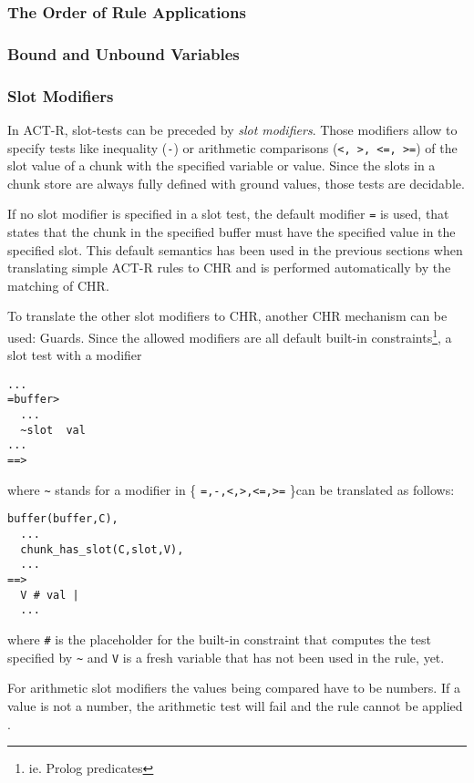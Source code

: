 \subsubsection{The Order of Rule Applications}

\subsubsection{Bound and Unbound Variables}

\subsubsection{Slot Modifiers}

In ACT-R, slot-tests can be preceded by \emph{slot modifiers}. Those modifiers allow to specify tests like inequality (\verb|-|) or arithmetic comparisons (\verb|<, >, <=, >=|) of the slot value of a chunk with the specified variable or value. Since the slots in a chunk store are always fully defined with ground values, those tests are decidable.

If no slot modifier is specified in a slot test, the default modifier \verb|=| is used, that states that the chunk in the specified buffer must have the specified value in the specified slot. This default semantics has been used in the previous sections when translating simple ACT-R rules to CHR and is performed automatically by the matching of CHR.

To translate the other slot modifiers to CHR, another CHR mechanism can be used: Guards. Since the allowed modifiers are all default built-in constraints\footnote{ie. Prolog predicates}, a slot test with a modifier

\begin{lstlisting}
...
=buffer>
  ...
  ~slot  val
...
==>
\end{lstlisting}

where \verb|~| stands for a modifier in \{ \verb|=,-,<,>,<=,>=| \}can be translated as follows:

\begin{lstlisting}
buffer(buffer,C),
  ...
  chunk_has_slot(C,slot,V),
  ...
==>
  V # val |
  ...
\end{lstlisting}

where \verb|#| is the placeholder for the built-in constraint that computes the test specified by \verb|~| and \verb|V| is a fresh variable that has not been used in the rule, yet.

For arithmetic slot modifiers the values being compared have to be numbers. If a value is not a number, the arithmetic test will fail and the rule cannot be applied \cite{actr_reference}.

